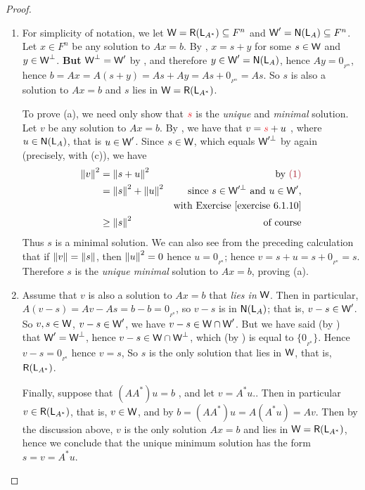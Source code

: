 \begin{proof} \ 

\begin{enumerate}
\item For simplicity of notation, we let \(\textsf{W} = \textsf{R}(\textsf{L}_{A^*}) \subseteq F^n\) and \(\textsf{W}' = \textsf{N}(\textsf{L}_A) \subseteq F^n\).
Let \(x \in F^n\) be any solution to \(Ax = b\).
By , \(x = s + y\) for some \(s \in \textsf{W}\) and \(y \in \textsf{W}^{\perp}\).
\textbf{But} \(\textsf{W}^{\perp} = \textsf{W}'\) by , and therefore \(y \in \textsf{W}' = \textsf{N}(\textsf{L}_A)\), hence \(Ay = 0_{_{F^m}}\), hence \(b = Ax = A(s + y) = As + Ay = As + 0_{_{F^m}} = As\).
So \(s\) is also a solution to \(Ax = b\) and \(s\) lies in \(\textsf{W} = \textsf{R}(\textsf{L}_{A^*})\).

To prove (a), we need only show that \(\RED{s}\) is the \emph{unique} and \emph{minimal} solution.
Let \(v\) be any solution to \(Ax = b\).
By , we have that \(v = \RED{s} + u\) , where \(u \in \textsf{N}(\textsf{L}_A)\), that is \(u \in \textsf{W}'\).
Since \(s \in \textsf{W}\), which equals \(\textsf{W}'^{\perp}\) by  again (precisely, with (c)), we have
\begin{align*}
    \norm{v}^2 & = \norm{s + u}^2 & \text{by \MAROON{(1)}} \\
    & = \norm{s}^2 + \norm{u}^2 & \text{since \(s \in \W'^{\perp}\) and \(u \in \W'\),} \\
    & & \text{with \EXEC{6.1.10}} \\
    & \ge \norm{s}^2 & \text{of course}
\end{align*}
Thus \(s\) is a minimal solution.
We can also see from the preceding calculation that if \(\left\lVert v\right\rVert = \left\lVert s\right\rVert\), then \(\left\lVert u\right\rVert^2 = 0\) hence \(u = 0_{_{F^n}}\); hence \(v = s + u = s + 0_{_{F^n}} = s\).
Therefore \(s\) is the \emph{unique minimal} solution to \(Ax = b\), proving (a).

\item
Assume that \(v\) is also a solution to \(Ax = b\) that \emph{lies in} \(\textsf{W}\).
Then in particular, \(A(v - s) = Av - As = b - b = 0_{_{F^n}}\), so \(v - s\) is in \(\textsf{N}(\textsf{L}_A)\);
that is, \(v - s \in \textsf{W}'\).
So \(v, s \in \textsf{W}\), \(v - s \in \textsf{W}'\), we have \(v - s \in \textsf{W} \cap \textsf{W}'\).
But we have said (by ) that \(\textsf{W}' = \textsf{W}^{\perp}\), hence \(v - s \in \textsf{W} \cap \textsf{W}^{\perp}\), which (by ) is equal to \(\{ 0_{_{F^n}} \}\).
Hence \(v - s = 0_{_{F^n}}\) hence \(v = s\),
So \(s\) is the only solution that lies in \(\textsf{W}\), that is, \(\textsf{R}(\textsf{L}_{A^*})\).

Finally, suppose that \((AA^*)u = b\) , and let \(v = A^*u.\).
Then in particular \(v \in \textsf{R}(\textsf{L}_{A^*})\), that is, \(v \in \textsf{W}\), and by  \(b = (A A^*)u = A (A^* u) = A v\).
Then by the discussion above, \(v\) is the only solution \(Ax = b\) and lies in \(\textsf{W} = \textsf{R}(\textsf{L}_{A^*})\), hence we conclude that the unique minimum solution has the form \(s = v = A^*u\).
\end{enumerate}
\end{proof}

